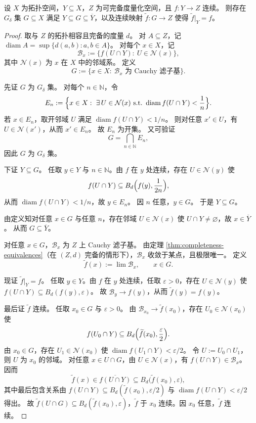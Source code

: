 \documentclass[lang=cn,a4paper,newtx,figureplace=section,tableplace=section]{elegantbook}
\begin{document}
\begin{theorem}\label{thm:continuous-extension-to-gdelta}
  设 $X$ 为拓扑空间，$Y\subseteq X$，$Z$ 为可完备度量化空间，且 $f:Y\to Z$ 连续。
  则存在 $G_\delta$ 集 $G\subseteq X$ 满足 $Y\subseteq G\subseteq\overline{Y}$，以及连续映射 $\widetilde f:G\to Z$ 使得 $\widetilde f\vert_Y=f$。
\end{theorem}
\begin{proof}
  取与 $Z$ 的拓扑相容且完备的度量 $d$。
  对 $A\subseteq Z$，记 $\operatorname{diam}A=\sup\{d(a,b):a,b\in A\}$。
  对每个 $x\in X$，记
  \[
    \mathcal B_x:=\{f(U\cap Y):\ U\in\mathcal N(x)\},
  \]
  其中 $\mathcal N(x)$ 为 $x$ 在 $X$ 中的邻域系。
  定义
  \[
    G:=\{x\in X:\ \mathcal B_x\text{ 为 Cauchy 滤子基}\}.
  \]

  先证 $G$ 为 $G_\delta$ 集。
  对每个 $n\in\mathbb N$，令
  \[
    E_n:=\Bigl\{x\in X:\ \exists\,U\in\mathcal N(x)\ \text{s.t.}\ \operatorname{diam}f(U\cap Y)<\frac{1}{n}\Bigr\}.
  \]
  若 $x\in E_n$，取开邻域 $U$ 满足 $\operatorname{diam}f(U\cap Y)<1/n$。
  则对任意 $x'\in U$，有 $U\in\mathcal N(x')$，从而 $x'\in E_n$。
  故 $E_n$ 为开集。
  又可验证
  \[
    G=\bigcap_{n\in\mathbb N}E_n,
  \]
  因此 $G$ 为 $G_\delta$ 集。

  下证 $Y\subseteq G$。
  任取 $y\in Y$ 与 $n\in\mathbb N$。由 $f$ 在 $y$ 处连续，存在 $U\in\mathcal N(y)$ 使
  \[
    f(U\cap Y)\subseteq B_d\Bigl(f(y),\frac{1}{2n}\Bigr),
  \]
  从而 $\operatorname{diam}f(U\cap Y)<1/n$，故 $y\in E_n$。
  因 $n$ 任意，$y\in G$。
  于是 $Y\subseteq G$。

  由定义知对任意 $x\in G$ 与任意 $n$，存在邻域 $U\in\mathcal N(x)$ 使 $U\cap Y\ne\varnothing$，故 $x\in\overline{Y}$。
  从而 $G\subseteq\overline{Y}$。

  对任意 $x\in G$，$\mathcal B_x$ 为 $Z$ 上 Cauchy 滤子基。
  由定理 \ref{thm:completeness-equivalences}（在 $(Z,d)$ 完备的情形下），$\mathcal B_x$ 收敛于某点，且极限唯一。
  定义
  \[
    \widetilde f(x):=\lim \mathcal B_x,\qquad x\in G.
  \]

  现证 $\widetilde f\vert_Y=f$。
  任取 $y\in Y$。由 $f$ 在 $y$ 处连续，任取 $\varepsilon>0$，存在 $U\in\mathcal N(y)$ 使 $f(U\cap Y)\subseteq B_d(f(y),\varepsilon)$。
  故 $\mathcal B_y\to f(y)$，从而 $\widetilde f(y)=f(y)$。

  最后证 $\widetilde f$ 连续。
  任取 $x_0\in G$ 与 $\varepsilon>0$。
  由 $\mathcal B_{x_0}\to \widetilde f(x_0)$，存在 $U_0\in\mathcal N(x_0)$ 使
  \[
    f(U_0\cap Y)\subseteq B_d\Bigl(\widetilde f(x_0),\frac{\varepsilon}{2}\Bigr).
  \]
  由 $x_0\in G$，存在 $U_1\in\mathcal N(x_0)$ 使 $\operatorname{diam}f(U_1\cap Y)<\varepsilon/2$。
  令 $U:=U_0\cap U_1$，则 $U$ 为 $x_0$ 的邻域。
  对任意 $x\in U\cap G$，由 $U\in\mathcal N(x)$，有 $f(U\cap Y)\in\mathcal B_x$。
  因而
  \[
    \widetilde f(x)\in \overline{f(U\cap Y)}\subseteq B_d\bigl(\widetilde f(x_0),\varepsilon\bigr),
  \]
  其中最后包含关系由 $f(U\cap Y)\subseteq B_d(\widetilde f(x_0),\varepsilon/2)$ 与 $\operatorname{diam}f(U\cap Y)<\varepsilon/2$ 得出。
  故 $\widetilde f(U\cap G)\subseteq B_d(\widetilde f(x_0),\varepsilon)$，$\widetilde f$ 于 $x_0$ 连续。因 $x_0$ 任意，$\widetilde f$ 连续。
\end{proof}
\end{document}
